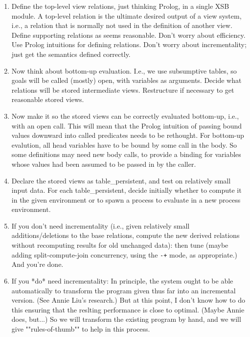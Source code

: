 \begin{enumerate}

\item Define the top-level view relations, just thinking Prolog, in a
single XSB module.  A top-level relation is the ultimate desired
output of a view system, i.e., a relation that is normally not used in
the definition of another view.  Define supporting relations as seems
reasonable.  Don't worry about efficiency. Use Prolog intuitions for
defining relations.  Don't worry about incrementality; just get the
semantics defined correctly.

\item Now think about bottom-up evaluation.  I.e., we use subsumptive
tables, so goals will be called (mostly) open, with variables as
arguments.  Decide what relations will be stored intermediate views.
Restructure if necessary to get reasonable stored views.

\item Now make it so the stored views can be correctly evaluated
bottom-up, i.e., with an open call.  This will mean that the Prolog
intuition of passing bound values downward into called predicates
needs to be rethought.  For bottom-up evalution, all head variables
have to be bound by some call in the body.  So some definitions may
need new body calls, to provide a binding for variables whose values
had been assumed to be passed in by the caller.

\item Declare the stored views as table\_persistent, and test on
relatively small input data. For each table\_persistent, decide initially
whether to compute it in the given environment or to spawn a process
to evaluate in a new process environment.

\item If you don't need incrementality (i.e., given relatively small
additions/deletions to the base relations, compute the new derived
relations without recomputing results for old unchanged data): then
tune (maybe adding split-compute-join concurrency, using the {\tt -+}
mode, as appropriate.)  And you're done.

\item If you *do* need incrementality: In principle, the system ought to
be able automatically to transform the program given thus far into an
incremental version.  (See Annie Liu's research.)  But at this point,
I don't know how to do this ensuring that the reslting performance is
close to optimal.  (Maybe Annie does, but...)  So we will transform
the existing program by hand, and we will give ""rules-of-thumb"" to
help in this process.


\end{enumerate}

